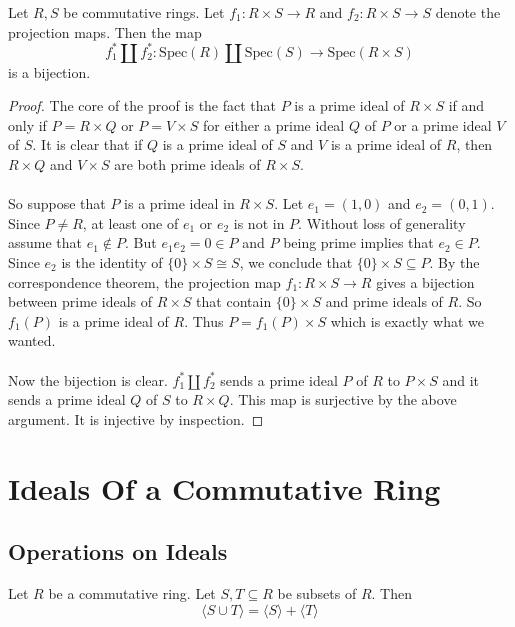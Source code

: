 \documentclass[a4paper]{article}
\begin{document}
\begin{lmm}{}{} Let $R,S$ be commutative rings. Let $f_1:R\times S\to R$ and $f_2:R\times S\to S$ denote the projection maps. Then the map $$f_1^\ast\amalg f_2^\ast:\text{Spec}(R)\amalg\text{Spec}(S)\to\text{Spec}(R\times S)$$ is a bijection. \tcbline
\begin{proof}
The core of the proof is the fact that $P$ is a prime ideal of $R\times S$ if and only if $P=R\times Q$ or $P=V\times S$ for either a prime ideal $Q$ of $P$ or a prime ideal $V$ of $S$. It is clear that if $Q$ is a prime ideal of $S$ and $V$ is a prime ideal of $R$, then $R\times Q$ and $V\times S$ are both prime ideals of $R\times S$. \\~\\

So suppose that $P$ is a prime ideal in $R\times S$. Let $e_1=(1,0)$ and $e_2=(0,1)$. Since $P\neq R$, at least one of $e_1$ or $e_2$ is not in $P$. Without loss of generality assume that $e_1\notin P$. But $e_1e_2=0\in P$ and $P$ being prime implies that $e_2\in P$. Since $e_2$ is the identity of $\{0\}\times S\cong S$, we conclude that $\{0\}\times S\subseteq P$. By the correspondence theorem, the projection map $f_1:R\times S\to R$ gives a bijection between prime ideals of $R\times S$ that contain $\{0\}\times S$ and prime ideals of $R$. So $f_1(P)$ is a prime ideal of $R$. Thus $P=f_1(P)\times S$ which is exactly what we wanted. \\~\\

Now the bijection is clear. $f_1^\ast\amalg f_2^\ast$ sends a prime ideal $P$ of $R$ to $P\times S$ and it sends a prime ideal $Q$ of $S$ to $R\times Q$. This map is surjective by the above argument. It is injective by inspection. 
\end{proof}
\end{lmm}

\pagebreak
\section{Ideals Of a Commutative Ring}
\subsection{Operations on Ideals}
\begin{prp}{}{} Let $R$ be a commutative ring. Let $S,T\subseteq R$ be subsets of $R$. Then $$\langle S\cup T\rangle=\langle S\rangle +\langle T\rangle$$
\end{prp}
\end{document}
